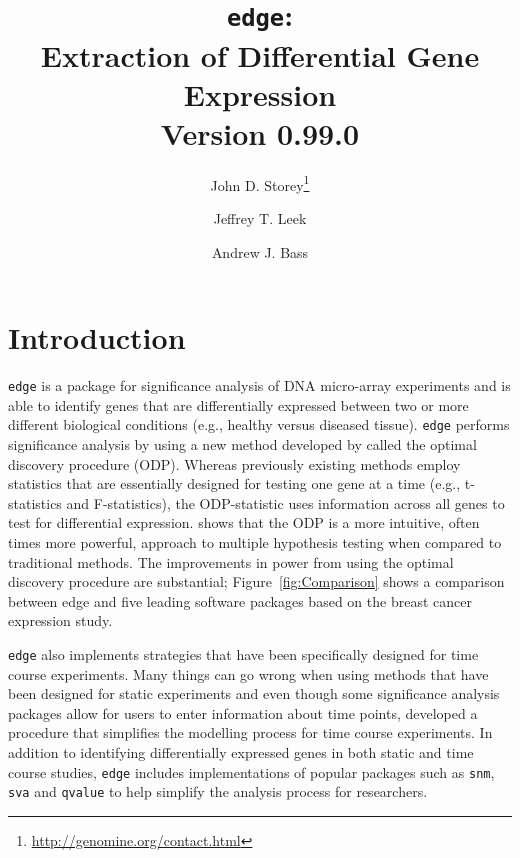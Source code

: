 \documentclass{article}\usepackage[]{graphicx}\usepackage[]{color}
\begin{document}
\title{{\tt edge}:\\ Extraction of Differential Gene Expression \\ Version 0.99.0}

\author[1]{John D. Storey\thanks{\url{http://genomine.org/contact.html}}}
\author[2]{Jeffrey T. Leek}
\author[1]{Andrew J. Bass}

\renewcommand\Authands{ and }

\maketitle
\tableofcontents
\newpage
\section{Introduction}

{\tt edge} is a package for significance analysis of DNA micro-array experiments and is able to identify genes that are differentially expressed between two or more different biological conditions (e.g., healthy versus diseased tissue). {\tt edge} performs significance analysis by using a new method developed by \cite{storey:2007} called the optimal discovery procedure (ODP). Whereas previously existing methods employ statistics that are essentially designed for testing one gene at a time (e.g., t-statistics and F-statistics), the ODP-statistic uses information across all genes to test for differential expression. \cite{storey:etal:2007} shows that the ODP is a more intuitive, often times more powerful, approach to multiple hypothesis testing when compared to traditional methods. The improvements in power from using the optimal discovery procedure are substantial; Figure~\ref{fig:Comparison} shows a comparison between edge and five leading software packages based on the \cite{hedenfalk:2001} breast cancer expression study.

\texttt{edge} also implements strategies that have been specifically designed for time course experiments. Many things can go wrong when using methods that have been designed for static experiments and even though some significance analysis packages allow for users to enter information about time points, \cite{storey:2005} developed a procedure that simplifies the modelling process for time course experiments. In addition to identifying differentially expressed genes in both static and time course studies, {\tt edge} includes implementations of popular packages such as {\tt snm}, {\tt sva} and {\tt qvalue} to help simplify the analysis process for researchers. 
\end{document}
